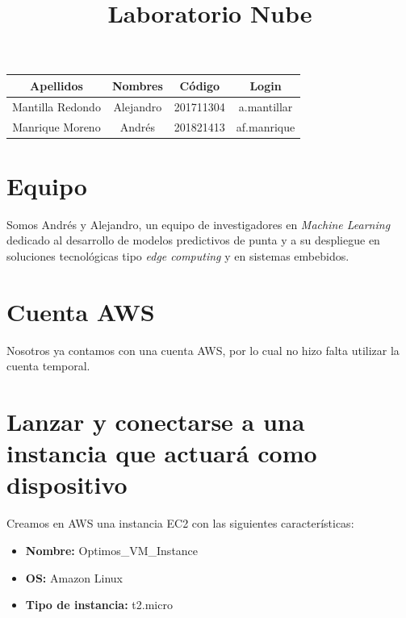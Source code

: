 \documentclass[10pt]{article}
\begin{document}
\title{Laboratorio Nube}
\date{}
\author{}
\maketitle
\vspace{-17ex}
\begin{table}[h]
\begin{center}
	\begin{tabular}{c c c c}
		\textbf{Apellidos} & \textbf{Nombres} & \textbf{Código} & \textbf{Login}\\
		\hline
		Mantilla Redondo & Alejandro & 201711304 & a.mantillar \\
		Manrique Moreno & Andrés & 201821413 & af.manrique \\
		\hline
	\end{tabular}
\end{center}
\label{tab:Nombres}
\end{table}

\section*{Equipo}

Somos Andrés y Alejandro, un equipo de investigadores en \textit{Machine Learning} dedicado al desarrollo de modelos predictivos de punta y a su despliegue en soluciones tecnológicas tipo \textit{edge computing} y en sistemas embebidos.

\section{Cuenta AWS}

Nosotros ya contamos con una cuenta AWS, por lo cual no hizo falta utilizar la cuenta temporal.

\section{Lanzar y conectarse a una instancia que actuará como dispositivo}

Creamos en AWS una instancia EC2 con las siguientes características:

\begin{itemize}
    \item \textbf{Nombre:} Optimos\_VM\_Instance
    \item \textbf{OS:} Amazon Linux
    \item \textbf{Tipo de instancia:} t2.micro
\end{itemize}
\end{document}
